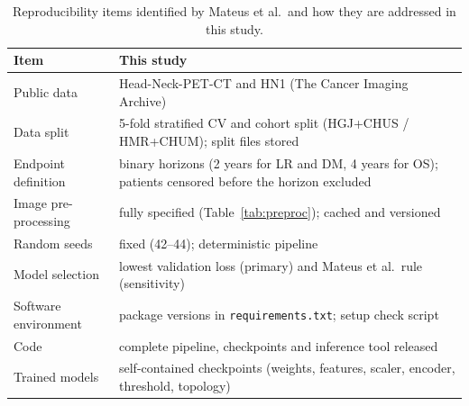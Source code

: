 \documentclass[11pt]{article}
\providecommand{\botrule}{\bottomrule}
\begin{document}
\begin{table}[!htb]
\centering\small
\caption{Reproducibility items identified by Mateus et al.\ and how they are addressed in this study.}\label{tab:checklist}
\begin{tabular}{@{}p{}p{}@{}}
\toprule
Item & This study \\
\midrule
Public data & Head-Neck-PET-CT and HN1 (The Cancer Imaging Archive) \\
Data split & 5-fold stratified CV and cohort split (HGJ+CHUS / HMR+CHUM); split files stored \\
Endpoint definition & binary horizons (2 years for LR and DM, 4 years for OS); patients censored before the horizon excluded \\
Image pre-processing & fully specified (Table~\ref{tab:preproc}); cached and versioned \\
Random seeds & fixed (42--44); deterministic pipeline \\
Model selection & lowest validation loss (primary) and Mateus et al.\ rule (sensitivity) \\
Software environment & package versions in \texttt{requirements.txt}; setup check script \\
Code & complete pipeline, checkpoints and inference tool released \\
Trained models & self-contained checkpoints (weights, features, scaler, encoder, threshold, topology) \\
\botrule
\end{tabular}
\end{table}
\end{document}
